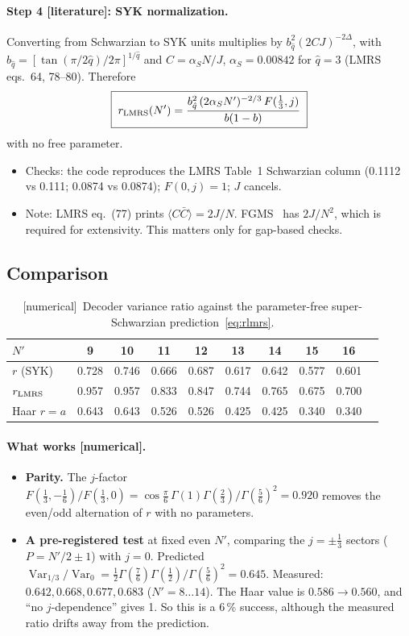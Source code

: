 \documentclass[11pt]{article}
\newcommand{\Var}{\operatorname{Var}}
\newcommand{\Np}{N'}
\newcommand{\tagbox}[2]{\textsf{\small\color{#1}[#2]}}
\newcommand{\EST}{\tagbox{cest}{literature}}
\newcommand{\NUM}{\tagbox{cnum}{numerical}}
\theoremstyle{remark}
\begin{document}
\paragraph{Step 4 \EST: SYK normalization.}
Converting from Schwarzian to SYK units multiplies by $b_{\hat q}^2(2CJ)^{-2\Delta}$, with
$b_{\hat q}=[\tan(\pi/2\hat q)/2\pi]^{1/\hat q}$ and $C=\alpha_SN/J$, $\alpha_S=0.00842$ for $\hat q=3$
(LMRS eqs.~64, 78--80). Therefore
\begin{equation}
\boxed{\;r_{\rm LMRS}(\Np)=\frac{b_{\hat q}^2\,(2\alpha_S\Np)^{-2/3}\,F(\tfrac13,j)}{b(1-b)}\;}
\label{eq:rlmrs}
\end{equation}
with no free parameter.
\begin{itemize}\itemsep1pt
\item Checks: the code reproduces the LMRS Table~1 Schwarzian column (0.1112 vs 0.111; 0.0874 vs 0.0874); $F(0,j)=1$;
  $J$ cancels.
\item Note: LMRS eq.~(77) prints $\langle C\bar C\rangle=2J/N$. FGMS~\cite[eq.~5.4]{FGMS} has $2J/N^2$, which is
  required for extensivity. This matters only for gap-based checks.
\end{itemize}

\subsection{Comparison}\label{sec:lmrscomp}
\begin{table}[h]\centering\small
\begin{tabular}{@{}lccccccccc@{}}\toprule
$\Np$ & 9 & 10 & 11 & 12 & 13 & 14 & 15 & 16\\\midrule
$r$ (SYK) & 0.728 & 0.746 & 0.666 & 0.687 & 0.617 & 0.642 & 0.577 & 0.601\\
$r_{\rm LMRS}$ & 0.957 & 0.957 & 0.833 & 0.847 & 0.744 & 0.765 & 0.675 & 0.700\\
Haar $r=a$ & 0.643 & 0.643 & 0.526 & 0.526 & 0.425 & 0.425 & 0.340 & 0.340\\\bottomrule
\end{tabular}
\caption{\NUM\ Decoder variance ratio against the parameter-free super-Schwarzian prediction~\eqref{eq:rlmrs}.}
\label{tab:lmrs}
\end{table}

\paragraph{What works \NUM.}
\begin{itemize}\itemsep1pt
\item \textbf{Parity.} The $j$-factor $F(\frac13,-\frac16)/F(\frac13,0)=\cos\frac\pi6\,\Gamma(1)\Gamma(\frac23)/\Gamma(\frac56)^2=0.920$
  removes the even/odd alternation of $r$ with no parameters.
\item \textbf{A pre-registered test} at fixed even $\Np$, comparing the $j=\pm\frac13$ sectors ($P=\Np/2\pm1$) with
  $j=0$. Predicted $\Var_{1/3}/\Var_0=\frac12\Gamma(\frac76)\Gamma(\frac12)/\Gamma(\frac56)^2=0.645$. Measured:
  $0.642,0.668,0.677,0.683$ ($\Np=8\ldots14$). The Haar value is $0.586\to0.560$, and ``no $j$-dependence'' gives 1.
  So this is a 6\,\% success, although the measured ratio drifts away from the prediction.
\end{itemize}
\end{document}
